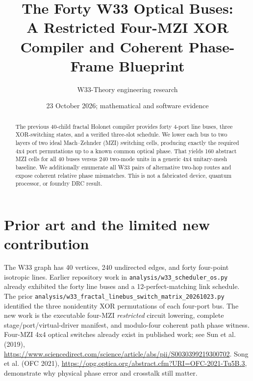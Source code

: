 \documentclass[10pt]{article}
\title{The Forty W33 Optical Buses:\\
A Restricted Four-MZI XOR Compiler and Coherent Phase-Frame Blueprint}
\author{W33-Theory engineering research}
\date{23 October 2026; mathematical and software evidence}
\begin{document}
\maketitle
\begin{abstract}
The previous 40-child fractal Holonet compiler provides forty 4-port line
buses, three XOR-switching states, and a verified three-slot schedule.
We lower each bus to two layers of two ideal Mach--Zehnder (MZI) switching
cells, producing exactly the required 4x4 port permutations up to a
known common optical phase. That yields 160 abstract MZI cells for all
40 buses versus 240 two-mode units in a generic 4x4 unitary-mesh
baseline. We additionally enumerate all W33 pairs of alternative
two-hop routes and expose coherent relative phase mismatches.
This is not a fabricated device, quantum processor, or foundry DRC result.
\end{abstract}
\tableofcontents

\section{Prior art and the limited new contribution}
The W33 graph has 40 vertices, 240 undirected edges, and forty
four-point isotropic lines. Earlier repository work in
\texttt{analysis/w33\_scheduler\_os.py} already exhibited the
forty line buses and a 12-perfect-matching link schedule.
The prior \texttt{analysis/w33\_fractal\_linebus\_switch\_matrix\_20261023.py}
identified the three nonidentity XOR permutations of each four-port bus.
The new work is the executable four-MZI \emph{restricted} circuit
lowering, complete stage/port/virtual-driver manifest, and modulo-four
coherent path phase witness. Four-MZI 4x4 optical switches already
exist in published work; see Sun et al. (2019),
\url{https://www.sciencedirect.com/science/article/abs/pii/S0030399219300702}.
Song et al. (OFC 2021),
\url{https://opg.optica.org/abstract.cfm?URI=OFC-2021-Tu5B.3},
demonstrate why physical phase error and crosstalk still matter.
\end{document}
